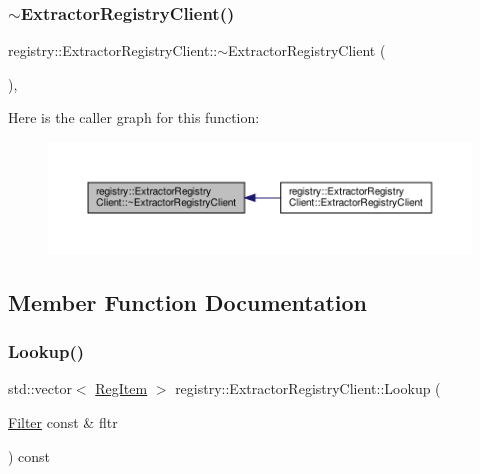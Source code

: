 \mbox{\label{classregistry_1_1ExtractorRegistryClient_a3c4ecec0c0a4ce7c25c7697889c253d9}} 
\subsubsection{\texorpdfstring{$\sim$\+Extractor\+Registry\+Client()}{~ExtractorRegistryClient()}}
{\footnotesize\ttfamily registry\+::\+Extractor\+Registry\+Client\+::$\sim$\+Extractor\+Registry\+Client (\begin{DoxyParamCaption}{ }\end{DoxyParamCaption})\hspace{0.3cm}{\ttfamily [default]}, {\ttfamily [noexcept]}}

Here is the caller graph for this function\+:\nopagebreak
\begin{figure}[H]
\begin{center}
\leavevmode
\includegraphics[width=350pt]{classregistry_1_1ExtractorRegistryClient_a3c4ecec0c0a4ce7c25c7697889c253d9_icgraph}
\end{center}
\end{figure}


\subsection{Member Function Documentation}
\mbox{\label{classregistry_1_1ExtractorRegistryClient_aae214dba3e9dabd81844e6dfa3958eeb}} 
\subsubsection{\texorpdfstring{Lookup()}{Lookup()}}
{\footnotesize\ttfamily std\+::vector$<$ \hyperlink{classregistry_1_1RegItem}{Reg\+Item} $>$ registry\+::\+Extractor\+Registry\+Client\+::\+Lookup (\begin{DoxyParamCaption}\item[{\hyperlink{classregistry_1_1Filter}{Filter} const \&}]{fltr }\end{DoxyParamCaption}) const}

